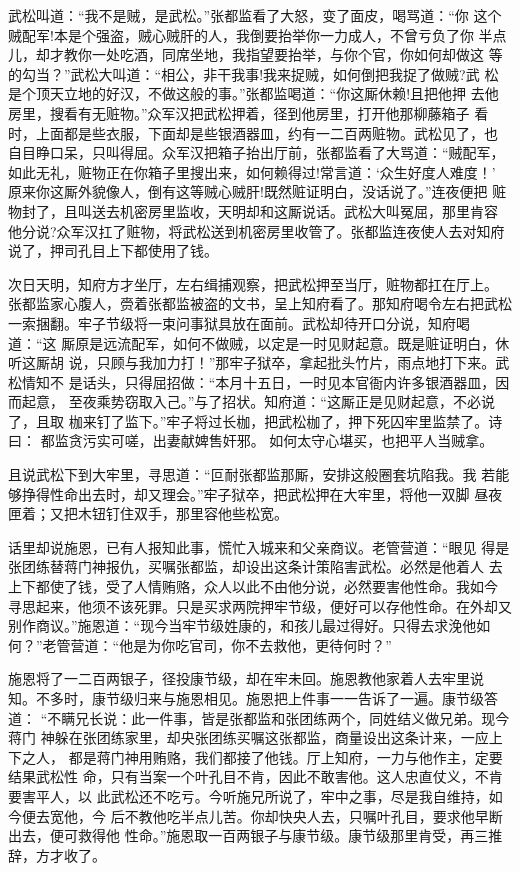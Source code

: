 武松叫道：“我不是贼，是武松。”张都监看了大怒，变了面皮，喝骂道：“你
这个贼配军!本是个强盗，贼心贼肝的人，我倒要抬举你一力成人，不曾亏负了你
半点儿，却才教你一处吃酒，同席坐地，我指望要抬举，与你个官，你如何却做这
等的勾当？”武松大叫道：“相公，非干我事!我来捉贼，如何倒把我捉了做贼?武
松是个顶天立地的好汉，不做这般的事。”张都监喝道：“你这厮休赖!且把他押
去他房里，搜看有无赃物。”众军汉把武松押着，径到他房里，打开他那柳藤箱子
看时，上面都是些衣服，下面却是些银酒器皿，约有一二百两赃物。武松见了，也
自目睁口呆，只叫得屈。众军汉把箱子抬出厅前，张都监看了大骂道：“贼配军，
如此无礼，赃物正在你箱子里搜出来，如何赖得过!常言道：‘众生好度人难度！’
原来你这厮外貌像人，倒有这等贼心贼肝!既然赃证明白，没话说了。”连夜便把
赃物封了，且叫送去机密房里监收，天明却和这厮说话。武松大叫冤屈，那里肯容
他分说?众军汉扛了赃物，将武松送到机密房里收管了。张都监连夜使人去对知府
说了，押司孔目上下都使用了钱。

次日天明，知府方才坐厅，左右缉捕观察，把武松押至当厅，赃物都扛在厅上。
张都监家心腹人，赍着张都监被盗的文书，呈上知府看了。那知府喝令左右把武松
一索捆翻。牢子节级将一束问事狱具放在面前。武松却待开口分说，知府喝道：“这
厮原是远流配军，如何不做贼，以定是一时见财起意。既是赃证明白，休听这厮胡
说，只顾与我加力打！”那牢子狱卒，拿起批头竹片，雨点地打下来。武松情知不
是话头，只得屈招做：“本月十五日，一时见本官衙内许多银酒器皿，因而起意，
至夜乘势窃取入己。”与了招状。知府道：“这厮正是见财起意，不必说了，且取
枷来钉了监下。”牢子将过长枷，把武松枷了，押下死囚牢里监禁了。诗曰：
都监贪污实可嗟，出妻献婢售奸邪。
如何太守心堪买，也把平人当贼拿。

且说武松下到大牢里，寻思道：“叵耐张都监那厮，安排这般圈套坑陷我。我
若能够挣得性命出去时，却又理会。”牢子狱卒，把武松押在大牢里，将他一双脚
昼夜匣着；又把木钮钉住双手，那里容他些松宽。

话里却说施恩，已有人报知此事，慌忙入城来和父亲商议。老管营道：“眼见
得是张团练替蒋门神报仇，买嘱张都监，却设出这条计策陷害武松。必然是他着人
去上下都使了钱，受了人情贿赂，众人以此不由他分说，必然要害他性命。我如今
寻思起来，他须不该死罪。只是买求两院押牢节级，便好可以存他性命。在外却又
别作商议。”施恩道：“现今当牢节级姓康的，和孩儿最过得好。只得去求浼他如
何？”老管营道：“他是为你吃官司，你不去救他，更待何时？”

施恩将了一二百两银子，径投康节级，却在牢未回。施恩教他家着人去牢里说
知。不多时，康节级归来与施恩相见。施恩把上件事一一告诉了一遍。康节级答道：
“不瞒兄长说：此一件事，皆是张都监和张团练两个，同姓结义做兄弟。现今蒋门
神躲在张团练家里，却央张团练买嘱这张都监，商量设出这条计来，一应上下之人，
都是蒋门神用贿赂，我们都接了他钱。厅上知府，一力与他作主，定要结果武松性
命，只有当案一个叶孔目不肯，因此不敢害他。这人忠直仗义，不肯要害平人，以
此武松还不吃亏。今听施兄所说了，牢中之事，尽是我自维持，如今便去宽他，今
后不教他吃半点儿苦。你却快央人去，只嘱叶孔目，要求他早断出去，便可救得他
性命。”施恩取一百两银子与康节级。康节级那里肯受，再三推辞，方才收了。

